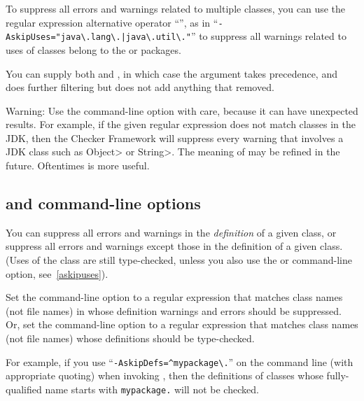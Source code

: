 To suppress all errors and warnings related to multiple classes, you can use
the regular expression alternative operator ``\code{|}'', as in
``{\codesize\verb+-AskipUses="java\.lang\.|java\.util\."+}'' to suppress
all warnings related to uses of classes belong to the  or
 packages.

You can supply both  and , in which case
the  argument takes precedence, and  does
further filtering but does not add anything that  removed.

Warning:  Use the  command-line option with care,
because it can have unexpected results.  For example, if the
given regular expression does not match classes in the JDK, then the
Checker Framework will suppress every warning that involves a JDK class
such as \<Object> or \<String>.  The meaning of  may be
refined in the future.  Oftentimes  is more useful.



\subsection{ and  command-line options\label{askipdefs}}

You can suppress all errors and warnings in the \emph{definition} of a given
class, or suppress all errors and warnings except those in the definition
of a given class.  (Uses of the class are still type-checked, unless you also use
the  or  command-line option,
see~\ref{askipuses}).

Set the  command-line option to a
regular expression that matches class names (not file names) in whose definition warnings and errors
should be suppressed.
Or, set the  command-line option to a
regular expression that matches class names (not file names) whose
definitions should be type-checked.

For example, if you use
``{\codesize\verb|-AskipDefs=^mypackage\.|}'' on the command line
(with appropriate quoting) when invoking
, then the definitions of 
classes whose fully-qualified name starts with \codesize\verb|mypackage.|
will not be checked.

